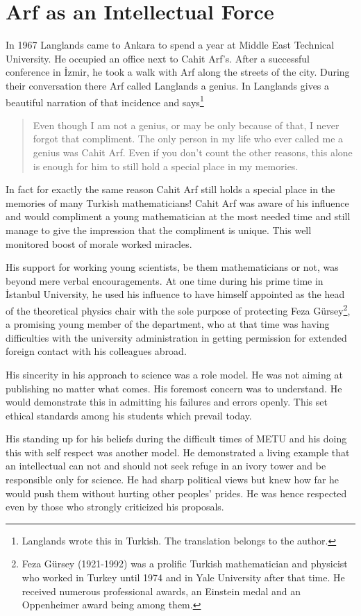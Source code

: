 \documentclass[12pt]{amsart}
\begin{document}
\section{Arf as an Intellectual Force}
In 1967 Langlands came to Ankara to spend a year at Middle East Technical University. He occupied an office next to Cahit Arf's. After a successful conference in {\.I}zmir, he took a walk with Arf along the streets of the city. During their conversation there Arf called Langlands a genius. In \cite{langlands} Langlands gives a beautiful narration of that incidence and says\footnote{Langlands wrote this in Turkish. The translation belongs to the author.}
\begin{quote}
Even though  I am not a genius, or may be only because of that, I never forgot that compliment. The only person in my life who ever called  me a genius was Cahit Arf. Even if you don't count the other reasons, this alone is enough for him to still hold a special place in my memories.
\end{quote}
In fact for exactly the same reason Cahit Arf still holds a special place in the memories of many Turkish mathematicians! Cahit Arf was  aware of his influence and would compliment a young mathematician at the most needed time and still manage to give the impression that the compliment is unique. This well monitored boost of morale worked miracles.

His support for working young scientists, be them mathematicians or not, was beyond mere verbal encouragements. At one time during his prime time in {\.I}stanbul University, he used his influence to have himself appointed as the head of the theoretical physics chair with the sole purpose of protecting Feza G\"{u}rsey\footnote{Feza G\"{u}rsey (1921-1992) was a prolific Turkish mathematician and physicist who worked in Turkey until 1974 and in Yale University after that time. He received numerous professional awards, an Einstein medal and an Oppenheimer  award being among them.}, a promising young member of the department, who at that time was having difficulties with the university administration in getting permission for extended foreign contact with his colleagues abroad.

His sincerity in his approach to science was a role model. He was not aiming at publishing no matter what comes. His foremost concern was to understand. He would demonstrate this in admitting his failures and errors openly. This set  ethical standards among his students which prevail today.

His standing up for his beliefs during the difficult times of METU and his doing this with self respect was another model. He demonstrated a living example that an intellectual can not and should not seek refuge in an ivory tower and be responsible only for science. He had sharp political views but knew how far he would push them without hurting other peoples' prides. He was hence respected even by those who strongly criticized his proposals.
\end{document}
